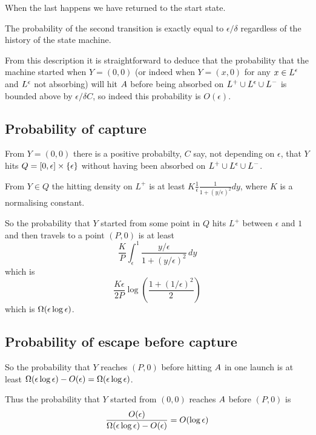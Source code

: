 {When the last happens we have returned to the start state.

The probability of the second transition is exactly equal to
$\epsilon/\delta$ regardless of the history of the state machine.

From this description it is straightforward to deduce that the
probability that the machine started when $Y = (0,0)$ (or indeed when
$Y = (x, 0)$ for any $x \in L^\epsilon$ and $L^\epsilon$ not absorbing) will hit
$A$ before being absorbed on $L^+ \cup L^\epsilon \cup L^-$ is
bounded above by $\epsilon/\delta C$, so indeed this probability is
$O(\epsilon)$.

\subsection{Probability of capture}

From $Y = (0,0)$ there is a positive probabilty, $C$ say, not
depending on $\epsilon$, that $Y$ hits $Q = [0, \epsilon] \times
\{\epsilon\}$ without having been absorbed on $L^+ \cup L^\epsilon \cup
L^-$.

From $Y \in Q$ the hitting density on $L^+$ is at least $K
\frac{1}{\epsilon} \frac{1}{1 + (y/\epsilon)^2} dy$, where $K$ is a
normalising constant.

So the probability that $Y$ started from some point in $Q$ hits $L^+$
between $\epsilon$ and $1$ and then travels to a point $(P,0)$ is at least
\[
\frac{K}{P} \int_{\epsilon}^{1} \frac{y/\epsilon}{1 + (y/\epsilon)^2}
\, dy
\]
which is
\[
\frac{K\epsilon}{2P} \log\left(\frac{1 + (1/\epsilon)^2}{2}\right)
\]
which is $\Omega(\epsilon\log\epsilon)$.

\subsection{Probability of escape before capture}

So the probability that $Y$ reaches $(P,0)$ before hitting
$A$ in one launch is at least
$\Omega(\epsilon\log\epsilon) - O(\epsilon) = \Omega(\epsilon\log\epsilon)
$.

Thus the probability that $Y$ started from $(0,0)$ reaches
$A$ before $(P,0)$ is
\[
\frac{O(\epsilon)}{\Omega(\epsilon\log\epsilon) - O(\epsilon)} = O(\log\epsilon)
\]

}

